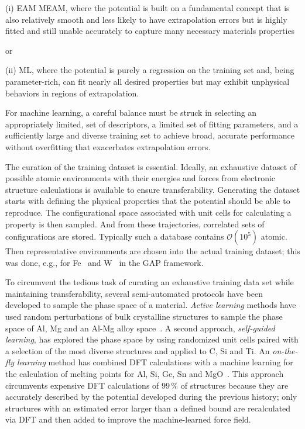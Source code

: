 \documentclass{article}
\begin{document}
(i) EAM MEAM, where the potential is built on a fundamental concept that is also relatively smooth and less likely to have extrapolation errors but is highly fitted and still unable accurately to capture many necessary materials properties 

or

(ii) ML, where the potential is purely a regression on the training set and, being parameter-rich, can fit nearly all desired properties but may exhibit unphysical behaviors in regions of extrapolation.

For machine learning, a careful balance must be struck in selecting an appropriately limited, set of descriptors, a limited set of fitting parameters, and a sufficiently large and diverse training set to achieve broad, accurate performance without overfitting that exacerbates extrapolation errors. 

The curation of the training dataset is essential.
Ideally, an exhaustive dataset of possible atomic environments with their energies and forces from electronic structure calculations is available to ensure transferability.
Generating the dataset starts with defining the physical properties that the potential should be able to reproduce. 
The configurational space associated with unit cells for calculating a property is then sampled.
And from these trajectories, correlated sets of configurations are stored.
Typically such a database contains $\mathcal{O}\left(10^5\right)$ atomic.
Then representative environments are chosen into the actual training dataset; this was done, e.g., for Fe~\cite{Dragoni2018AchievingIron} and W~\cite{Szlachta2014AccuracyTungsten} in the GAP framework.

To circumvent the tedious task of curating an exhaustive training data set while maintaining transferability, several semi-automated protocols have been developed to sample the phase space of a material.
\textit{Active learning} methods have used random perturbations of bulk crystalline structures to sample the phase space of Al, Mg and an Al-Mg alloy space~\cite{Zhang2019ActiveSimulation}.
A second approach, \textit{self-guided learning}, has explored the phase space by using randomized unit cells paired with a selection of the most diverse structures and applied to C, Si and Ti.
An \textit{on-the-fly learning} method has combined DFT calculations with a machine learning for the calculation of melting points for Al, Si, Ge, Sn and MgO~\cite{Jinnouchi2019On-the-flyPointsb}.
This approach circumvents expensive DFT calculations of $99\,$\% of structures because they are accurately described by the potential developed during the previous history; only structures with an estimated error larger than a defined bound are recalculated via DFT and then added to improve the machine-learned force field.
\end{document}
